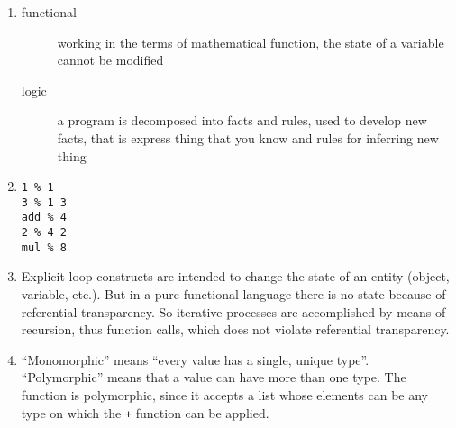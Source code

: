 \begin{enumerate}
\item 
\begin{description}
\item [functional] working in the terms of mathematical function, the state of a variable cannot be modified
\item [logic] a program is decomposed into facts and rules, used to develop new facts, that is express thing that you know and rules for inferring new thing
\end{description}

\item
\texttt{1 \% 1\\
	3 \% 1 3\\
	add \% 4\\
	2 \% 4 2\\
	mul \% 8}


\item Explicit loop constructs are intended to change the state of an entity (object, variable, etc.). But in a pure functional language there is no state because of referential transparency. So iterative processes are accomplished by means of recursion, thus function calls, which does not violate referential transparency.

\item ``Monomorphic'' means ``every value has a single, unique type''. ``Polymorphic'' means that a value can have more than one type. The function is polymorphic, since it accepts a list whose elements can be any type on which the \texttt{+} function can be applied.



\end{enumerate}
